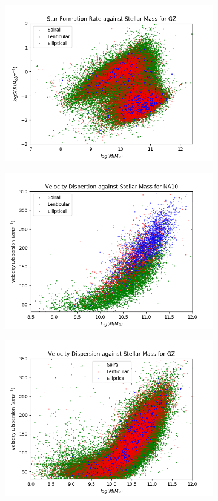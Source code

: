 \documentclass[12pt, onecolumn]{aa}
\begin{document}
\begin{figure}
\begin{subfigure}[t]{0.499\linewidth}
        \caption{}
        \label{fig:sfr_na}
    \end{subfigure}
    \begin{subfigure}[t]{0.499\linewidth}
    \centering
        \includegraphics[width=.85\linewidth]{Figures/property_graphs/SFR_GZ_2.png}
        \caption{}
        \label{fig:sfr_gz}
    \end{subfigure}
    \begin{subfigure}[t]{0.499\linewidth}
    \centering
        \includegraphics[width=.85\linewidth]{Figures/property_graphs/V_Disp_NA10.png}
        \caption{}
        \label{fig:vdisp_na}
    \end{subfigure}
    \begin{subfigure}[t]{0.499\linewidth}
    \centering
        \includegraphics[width=.85\linewidth]{Figures/property_graphs/V_Disp_GZ_2.png}

\end{subfigure}
\end{figure}
\end{document}
